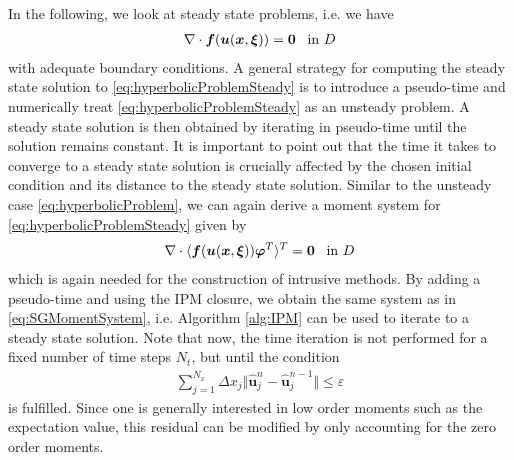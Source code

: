 In the following, we look at steady state problems, i.e. we have
\begin{align}\label{eq:hyperbolicProblemSteady}
\nabla\cdot\bm{f}(\bm{u}(\bm{x},\bm{\xi})) = \bm{0} \enskip \text{ in } D
\end{align}
with adequate boundary conditions. A general strategy for computing the steady state solution to \eqref{eq:hyperbolicProblemSteady} is to introduce a pseudo-time and numerically treat \eqref{eq:hyperbolicProblemSteady} as an unsteady problem. A steady state solution is then obtained by iterating in pseudo-time until the solution remains constant. It is important to point out that the time it takes to converge to a steady state solution is crucially affected by the chosen initial condition and its distance to the steady state solution.
Similar to the unsteady case \eqref{eq:hyperbolicProblem}, we can again derive a moment system for \eqref{eq:hyperbolicProblemSteady} given by
\begin{align}\label{eq:MomentSystemSteady}
\nabla\cdot\langle\bm{f}(\bm{u}(\bm{x},\bm{\xi}))\bm{\varphi}^T\rangle^T = \bm{0} \enskip \text{ in } D
\end{align}
which is again needed for the construction of intrusive methods. By adding a pseudo-time and using the IPM closure, we obtain the same system as in \eqref{eq:SGMomentSystem}, i.e. Algorithm \ref{alg:IPM} can be used to iterate to a steady state solution. Note that now, the time iteration is not performed for a fixed number of time steps $N_t$, but until the condition
\begin{align}\label{eq:residualUnsteady}
\sum_{j = 1}^{N_x} \Delta x_j \Vert \bm{\hat{u}}_j^n - \bm{\hat{u}}_j^{n-1} \Vert \leq \varepsilon
\end{align}
is fulfilled. Since one is generally interested in low order moments such as the expectation value, this residual can be modified by only accounting for the zero order moments.

